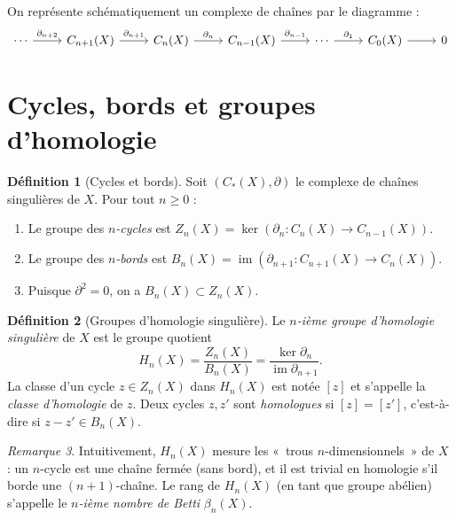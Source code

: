 \documentclass[12pt,a4paper,openany]{book}
\theoremstyle{definition}
\newtheorem{definition}{Définition}[chapter]
\theoremstyle{plain}
\theoremstyle{remark}
\newtheorem{remarque}[definition]{Remarque}
\DeclareMathOperator{\im}{im}
\begin{document}
On représente schématiquement un complexe de chaînes par le diagramme :
\[
\begin{tikzcd}
  \cdots \ar[r, "\partial_{n+2}"] & C_{n+1}(X) \ar[r, "\partial_{n+1}"] & C_n(X) \ar[r, "\partial_n"]
  & C_{n-1}(X) \ar[r, "\partial_{n-1}"] & \cdots \ar[r, "\partial_1"] & C_0(X) \ar[r] & 0
\end{tikzcd}
\]

\section{Cycles, bords et groupes d'homologie}\label{sec:groupes-homologie}

\begin{definition}[Cycles et bords]\label{def:cycles-bords}
Soit $(C_*(X), \partial)$ le complexe de chaînes singulières de $X$. Pour tout $n \geq 0$ :
\begin{enumerate}[label=(\roman*)]
  \item Le groupe des \emph{$n$-cycles} est $Z_n(X) = \ker(\partial_n \colon C_n(X) \to C_{n-1}(X))$.
  \item Le groupe des \emph{$n$-bords} est $B_n(X) = \im(\partial_{n+1} \colon C_{n+1}(X) \to C_n(X))$.
  \item Puisque $\partial^2 = 0$, on a $B_n(X) \subset Z_n(X)$.
\end{enumerate}
\end{definition}

\begin{definition}[Groupes d'homologie singulière]\label{def:groupes-homologie}
Le \emph{$n$-ième groupe d'homologie singulière} de $X$ est le groupe quotient
\[
  H_n(X) = \frac{Z_n(X)}{B_n(X)} = \frac{\ker \partial_n}{\im \partial_{n+1}}.
\]
La classe d'un cycle $z \in Z_n(X)$ dans $H_n(X)$ est notée $[z]$ et s'appelle la
\emph{classe d'homologie} de $z$. Deux cycles $z, z'$ sont
\emph{homologues} si $[z] = [z']$, c'est-à-dire si $z - z' \in B_n(X)$.
\end{definition}

\begin{remarque}\label{rem:homologie-mesure-trous}
Intuitivement, $H_n(X)$ mesure les «~trous $n$-dimensionnels~» de $X$ : un $n$-cycle est une
chaîne fermée (sans bord), et il est trivial en homologie s'il borde une $(n+1)$-chaîne.
Le rang de $H_n(X)$ (en tant que groupe abélien) s'appelle le \emph{$n$-ième nombre de Betti}
 $\beta_n(X)$.
\end{remarque}
\end{document}
